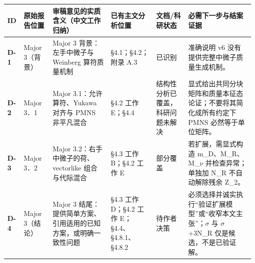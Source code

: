 \documentclass[
  chinese,
  UTF8]{ctexart}
\newcounter{none} %
\begin{document}
{\def\LTcaptype{none} %
\begin{longtable}[]{@{}
  >{\raggedright\arraybackslash}p{}
  >{\raggedright\arraybackslash}p{}
  >{\raggedright\arraybackslash}p{}
  >{\raggedright\arraybackslash}p{}
  >{\raggedright\arraybackslash}p{}
  >{\raggedright\arraybackslash}p{}@{}}
\toprule\noalign{}
\begin{minipage}[b]{\linewidth}\raggedright
ID
\end{minipage} & \begin{minipage}[b]{\linewidth}\raggedright
原始报告位置
\end{minipage} & \begin{minipage}[b]{\linewidth}\raggedright
审稿意见的实质含义（中文工作归纳）
\end{minipage} & \begin{minipage}[b]{\linewidth}\raggedright
已有主文分析位置
\end{minipage} & \begin{minipage}[b]{\linewidth}\raggedright
文档/科研状态
\end{minipage} & \begin{minipage}[b]{\linewidth}\raggedright
必需下一步与结案证据
\end{minipage} \\
\midrule\noalign{}
\endhead
\bottomrule\noalign{}
\endlastfoot
\textbf{D-1} & Major 3（背景） & Major 3 背景：左手中微子与 Weinberg
算符质量机制 & §4.1；§4.2；附录 A.3 & 已识别 & 准确说明 v6
没有提供完整中微子质量生成机制。 \\
\textbf{D-2} & Major 3．1 & Major 3.1：允许算符、Yukawa 对齐与 PMNS
非平凡混合 & §4.2 工作 E；§4.4 & 结构性分析已覆盖，科研问题未解决 &
显式给出共同分块矩阵和质量本征态论证；不要将其简化成所有约定下 PMNS
必然等于单位矩阵。 \\
\textbf{D-3} & Major 3．2 & Major 3.2：右手中微子的荷、vectorlike
组合与代际混合 & §4.3 工作 B；§4.2 工作 E & 部分覆盖 &
若扩展，需显式构造 m\_D、M\_R、M\_\ensuremath{\nu} 并检查异常；单独加
N\_R 不自动解除残余 Z\_2。 \\
\textbf{D-4} & Major 3（结论） & Major 3
结尾：提供简单方案、引用适用的已知方案，或明确一致性问题 & §4.3 工作
D；§4.2 工作 E；§4.4、§4.8.1、§4.8.2 & 待作者决策 &
必须选择并诚实执行``验证扩展模型''或``收窄本文主张''；\ensuremath{\sigma}
与 \ensuremath{\sigma}+3N\_R 仅是候选，不是已验证解。 \\
\end{longtable}
}
\end{document}
